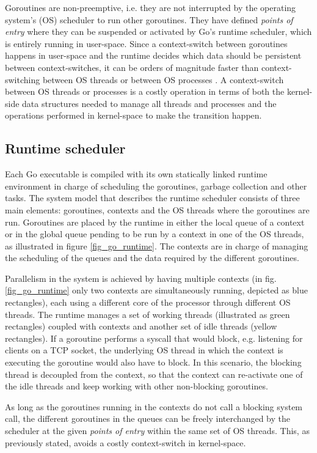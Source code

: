 Goroutines are non-preemptive, i.e. they are not interrupted by the operating system's (OS) scheduler to run other goroutines. They have defined \textit{points of entry} where they can be suspended or activated by Go's runtime scheduler, which is entirely running in user-space. Since a context-switch between goroutines happens in user-space and the runtime decides which data should be persistent between context-switches, it can be orders of magnitude faster than context-switching between OS threads \cite{Cox-Buday2017} or between OS processes \cite{Kerrisk2010}. A context-switch between OS threads or processes is a costly operation in terms of both the kernel-side data structures needed to manage all threads and processes and the operations performed in kernel-space to make the transition happen.

\subsection{Runtime scheduler}
Each Go executable is compiled with its own statically linked runtime environment in charge of scheduling the goroutines, garbage collection and other tasks. The system model that describes the runtime scheduler consists of three main elements: goroutines, contexts and the OS threads where the goroutines are run. Goroutines are placed by the runtime in either the local queue of a context or in the global queue pending to be run by a context in one of the OS threads, as illustrated in figure \ref{fig_go_runtime}. The contexts are in charge of managing the scheduling of the queues and the data required by the different goroutines.

Parallelism in the system is achieved by having multiple contexts (in fig. \ref{fig_go_runtime} only two contexts are simultaneously running, depicted as blue rectangles), each using a different core of the processor through different OS threads. The runtime manages a set of working threads (illustrated as green rectangles) coupled with contexts and another set of idle threads (yellow rectangles).  If a goroutine performs a syscall that would block, e.g. listening for clients on a TCP socket, the underlying OS thread in which the context is executing the goroutine would also have to block. In this scenario, the blocking thread is decoupled from the context, so that the context can re-activate one of the idle threads and keep working with other non-blocking goroutines.

As long as the goroutines running in the contexts do not call a blocking system call, the different goroutines in the queues can be freely interchanged by the scheduler at the given \textit{points of entry} within the same set of OS threads. This, as previously stated, avoids a costly context-switch in kernel-space. 

